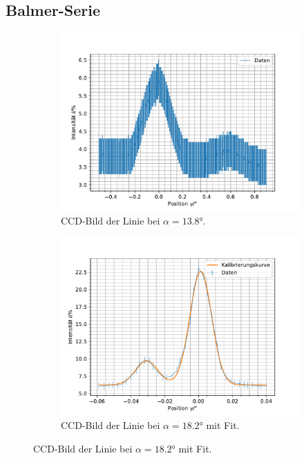 \documentclass{article}
\begin{document}
\subsection{Balmer-Serie}
\begin{figure}[h!]
  \centering
  \begin{subfigure}{0.49\textwidth}
    \includegraphics[width=\textwidth]{line13.8.pdf}
    \caption{CCD-Bild der Linie bei $\alpha=\ang{13.8}$.}
  \end{subfigure}
  \hfill
  \begin{subfigure}{0.49\textwidth}
    \includegraphics[width=\textwidth]{line18.2.pdf}
    \caption{CCD-Bild der Linie bei $\alpha=\ang{18.2}$ mit Fit.}
  \end{subfigure}


\end{figure}
\end{document}
